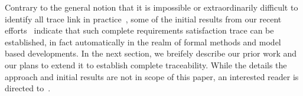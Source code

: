 
Contrary to the general notion that it is impossible or extraordinarily difficult to identify all trace link in practice~\cite{stravsunskas2002traceability}, some of the initial results from our recent efforts~\cite{IVCTechReport} indicate that such complete requirements satisfaction trace can be established, in fact automatically in the realm of formal methods and model based developments. In the next section, we breifely describe our prior work and our plans to extend it to establish complete traceability. While the details the approach and initial results are not in scope of this paper, an interested reader is directed to~\cite{IVCTechReport}.



